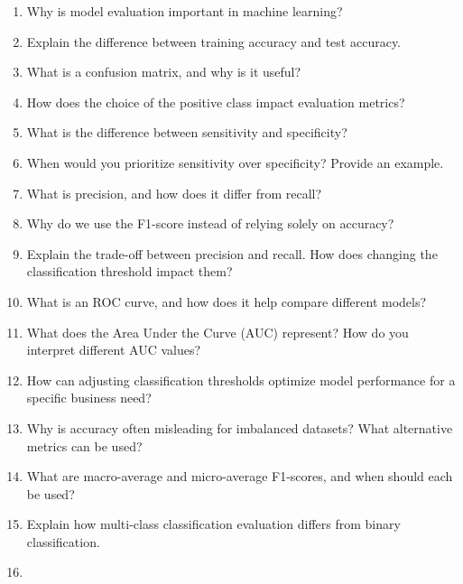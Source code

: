 \documentclass[
]{book}
\providecommand{\tightlist}{%
  \setlength{\itemsep}{0pt}\setlength{\parskip}{0pt}}
\theoremstyle{definition}
\theoremstyle{definition}
\theoremstyle{definition}
\theoremstyle{definition}
\theoremstyle{remark}
\begin{document}
\begin{enumerate}
\def\labelenumi{\arabic{enumi}.}
\tightlist
\item
  Why is model evaluation important in machine learning?\\
\item
  Explain the difference between training accuracy and test accuracy.\\
\item
  What is a confusion matrix, and why is it useful?\\
\item
  How does the choice of the positive class impact evaluation metrics?\\
\item
  What is the difference between sensitivity and specificity?\\
\item
  When would you prioritize sensitivity over specificity? Provide an example.\\
\item
  What is precision, and how does it differ from recall?\\
\item
  Why do we use the F1-score instead of relying solely on accuracy?\\
\item
  Explain the trade-off between precision and recall. How does changing the classification threshold impact them?\\
\item
  What is an ROC curve, and how does it help compare different models?\\
\item
  What does the Area Under the Curve (AUC) represent? How do you interpret different AUC values?\\
\item
  How can adjusting classification thresholds optimize model performance for a specific business need?\\
\item
  Why is accuracy often misleading for imbalanced datasets? What alternative metrics can be used?\\
\item
  What are macro-average and micro-average F1-scores, and when should each be used?\\
\item
  Explain how multi-class classification evaluation differs from binary classification.\\
\item

\end{enumerate}
\end{document}

